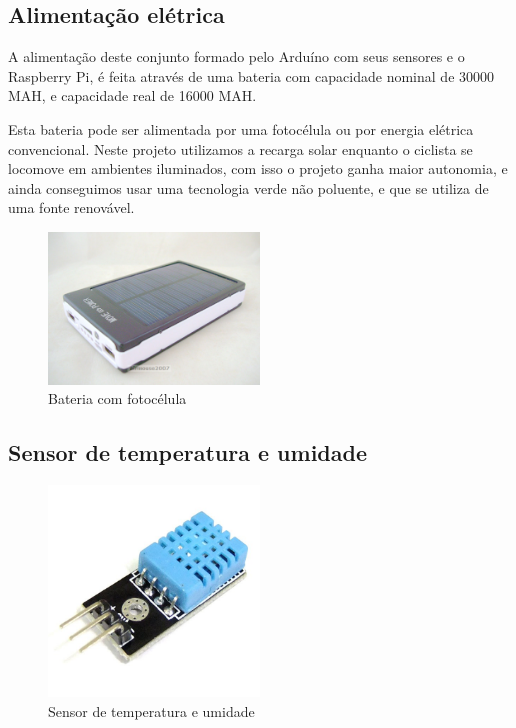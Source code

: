 \documentclass[final,12pt, times, 5p, twocolumn]{elsarticle}
\begin{document}
\subsection{Alimentação elétrica}

A alimentação deste conjunto formado pelo Arduíno com seus sensores e o Raspberry Pi, é feita através de uma bateria com capacidade nominal de 30000 MAH, e capacidade real de 16000 MAH.

Esta bateria pode ser alimentada por uma fotocélula ou por energia elétrica convencional. Neste projeto utilizamos a recarga solar enquanto o ciclista se locomove em ambientes iluminados, com isso o projeto ganha maior autonomia, e ainda conseguimos usar uma tecnologia verde\cite{tecnologia verde} não poluente, e que se utiliza de uma fonte renovável.

\begin{figure}[ht!]
\centering
\includegraphics[width=0.5\textwidth]{bateria.jpg}
\caption{\label{fig:bateria}Bateria com fotocélula}
\end{figure}

\subsection{Sensor de temperatura e umidade}

\begin{figure}[ht!]
\centering
\includegraphics[width=0.5\textwidth]{dht11.jpg}
\caption{\label{fig:dht11}Sensor de temperatura e umidade}
\end{figure}
\end{document}
